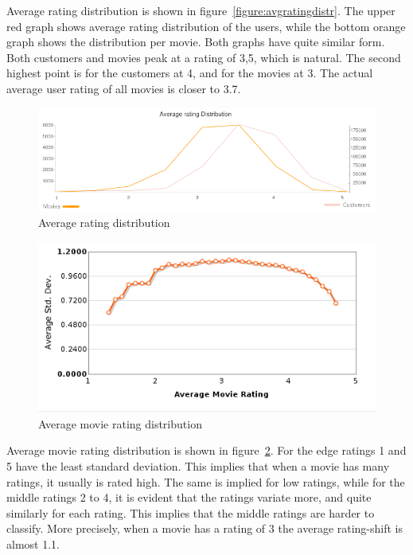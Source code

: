 Average rating distribution is shown in figure~\ref{figure:avgratingdistr}. The upper red graph shows average rating distribution of the users, while the bottom orange graph shows the distribution per movie. Both graphs have quite similar form. Both customers and movies peak at a rating of 3,5, which is natural. The second highest point is for the customers at 4, and for the movies at 3. The actual average user rating of all movies is closer to 3.7.

\begin{figure}[H]
\includegraphics[width=5in]{image/avgratdistrover.png}
\centering
\caption{Average rating distribution}
\label{figure:avgratdistrover}
\end{figure}


\begin{figure}[H]
\includegraphics[width=5in]{image/avgmovierating.png}
\centering
\caption{Average movie rating distribution~\cite{td-nf-r}}
\label{figure:avgmovierating}
\end{figure}

Average movie rating distribution is shown in figure~\ref{figure:avgmovierating}. For the edge ratings 1 and 5 have the least standard deviation. This implies that when a movie has many ratings, it usually is rated high. The same is implied for low ratings, while for the middle ratings 2 to 4, it is evident that the ratings variate more, and quite similarly for each rating. This implies that the middle ratings are harder to classify. More precisely, when a movie has a rating of 3 the average rating-shift is almost 1.1.


